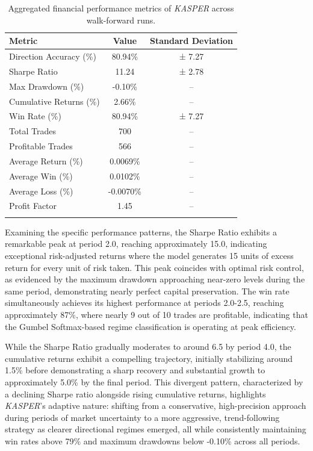 \documentclass[conference,10pt]{IEEEtran}
\begin{document}
\begin{table}[h]
\centering
\caption{Aggregated financial performance metrics of \textit{KASPER} across walk-forward runs.}
\label{tab:kasper-metrics}
\begin{tabular}{lcc}
\toprule
\textbf{Metric} & \textbf{Value} & \textbf{Standard Deviation} \\
\midrule
Direction Accuracy (\%)     & 80.94\%  & ± 7.27 \\
Sharpe Ratio                & 11.24    & ± 2.78 \\
Max Drawdown (\%)           & -0.10\%  & --     \\
Cumulative Returns (\%)     & 2.66\%   & --     \\
Win Rate (\%)               & 80.94\%  & ± 7.27 \\
Total Trades                & 700      & --     \\
Profitable Trades           & 566      & --     \\
Average Return (\%)         & 0.0069\% & --     \\
Average Win (\%)            & 0.0102\% & --     \\
Average Loss (\%)           & -0.0070\%& --     \\
Profit Factor               & 1.45     & --     \\
\bottomrule
\label{wfa}
\end{tabular}
\end{table}
Examining the specific performance patterns, the Sharpe Ratio exhibits a remarkable peak at period 2.0, reaching approximately 15.0, indicating exceptional risk-adjusted returns where the model generates 15 units of excess return for every unit of risk taken. This peak coincides with optimal risk control, as evidenced by the maximum drawdown approaching near-zero levels during the same period, demonstrating nearly perfect capital preservation. The win rate simultaneously achieves its highest performance at periods 2.0-2.5, reaching approximately 87\%, where nearly 9 out of 10 trades are profitable, indicating that the Gumbel Softmax-based regime classification is operating at peak efficiency. 

While the Sharpe Ratio gradually moderates to around 6.5 by period 4.0, the cumulative returns exhibit a compelling trajectory, initially stabilizing around 1.5\% before demonstrating a sharp recovery and substantial growth to approximately 5.0\% by the final period. This divergent pattern, characterized by a declining Sharpe ratio alongside rising cumulative returns, highlights \textit{KASPER}'s adaptive nature: shifting from a conservative, high-precision approach during periods of market uncertainty to a more aggressive, trend-following strategy as clearer directional regimes emerged, all while consistently maintaining win rates above 79\% and maximum drawdowns below -0.10\% across all periods.
\end{document}
